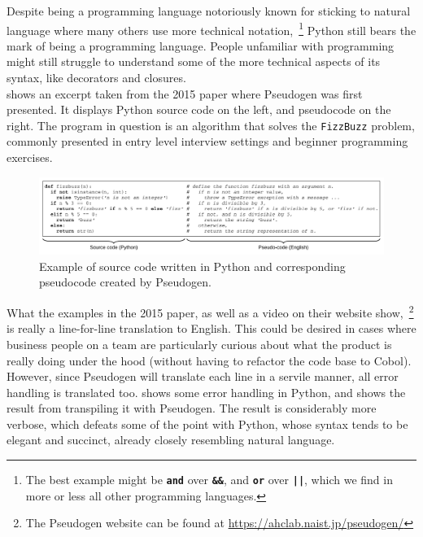Despite being a programming language notoriously known for sticking to natural language where many others use more technical notation,~\footnote{The best example might be \textbf{\texttt{and}} over \textbf{\texttt{\&\&}}, and \textbf{\texttt{or}} over \textbf{\texttt{||}}, which we find in more or less all other programming languages.} Python still bears the mark of being a programming language. People unfamiliar with programming might still struggle to understand some of the more technical aspects of its syntax, like decorators and closures. \\

 shows an excerpt taken from the 2015 paper where Pseudogen was first presented. It displays Python source code on the left, and pseudocode on the right. The program in question is an algorithm that solves the \texttt{FizzBuzz} problem, commonly presented in entry level interview settings and beginner programming exercises. \\

\begin{figure}[ht]
    \centering
    \includegraphics[scale=0.52]{assets/odaetal.png}
    \caption{Example of source code written in Python and corresponding pseudocode created by Pseudogen.}
    \label{pseudogenExample1}
\end{figure}

What the examples in the 2015 paper, as well as a video on their website show,~\footnote{The Pseudogen website can be found at \url{https://ahclab.naist.jp/pseudogen/}} is really a line-for-line translation to English. This could be desired in cases where business people on a team are particularly curious about what the product is really doing under the hood (without having to refactor the code base to Cobol). \\

However, since Pseudogen will translate each line in a servile manner, all error handling is translated too.  shows some error handling in Python, and  shows the result from transpiling it with Pseudogen. The result is considerably more verbose, which defeats some of the point with Python, whose syntax tends to be elegant and succinct, already closely resembling natural language. \\

